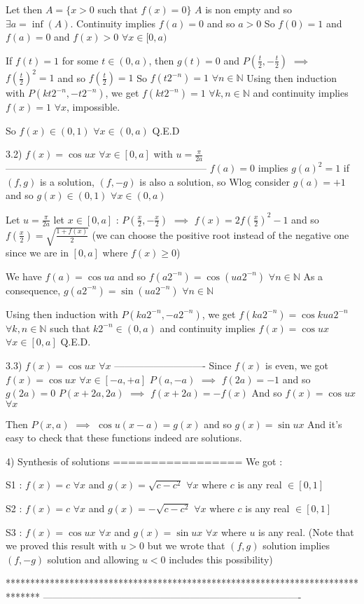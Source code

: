 \begin{solution}
Let then $A=\{x>0$ such that $f(x)=0\}$
$A$ is non empty and so $\exists a=\inf(A)$. Continuity implies $f(a)=0$ and so $a>0$
So $f(0)=1$ and $f(a)=0$ and $f(x)>0$ $\forall x\in[0,a)$

If $f(t)=1$ for some $t\in(0,a)$, then $g(t)=0$ and $P(\frac t2,-\frac t2)$ $\implies$ $f(\frac t2)^2=1$ and so $f(\frac t2)=1$
So $f(t2^{-n})=1$ $\forall n\in\mathbb N$
Using then induction with $P(kt2^{-n},-t2^{-n})$, we get $f(kt2^{-n})=1$ $\forall k,n\in\mathbb N$ and continuity implies $f(x)=1$ $\forall x$, impossible.

So $f(x)\in(0,1)$ $\forall x\in(0,a)$
Q.E.D

3.2) $f(x)=\cos ux$ $\forall x\in [0,a]$ with $u=\frac{\pi}{2a}$
--------------------------------------------------------------
$f(a)=0$ implies $g(a)^2=1$
if $(f,g)$ is a solution, $(f,-g)$ is also a solution, so Wlog consider $g(a)=+1$ and so $g(x)\in(0,1)$ $\forall x\in(0,a)$

Let $u=\frac{\pi}{2a}$
let $x\in [0,a]$ : $P(\frac x2,-\frac x2)$ $\implies$ $f(x)=2f(\frac x2)^2-1$ and so $f(\frac x2)=\sqrt{\frac{1+f(x)}2}$
(we can choose the positive root instead of the negative one since we are in $[0,a]$ where $f(x)\ge 0$)

We have $f(a)=\cos ua$ and so $f(a2^{-n})=\cos (ua2^{-n})$ $\forall n\in\mathbb N$
As a consequence, $g(a2^{-n})=\sin (ua2^{-n})$ $\forall n\in\mathbb N$

Using then induction with $P(ka2^{-n},-a2^{-n})$, we get $f(ka2^{-n})=\cos kua2^{-n} $ $\forall k,n\in\mathbb N$ such that $k2^{-n}\in(0,a)$ and continuity implies $f(x)=\cos ux$ $\forall x\in [0,a]$
Q.E.D.

3.3) $f(x)=\cos ux$ $\forall x$
----------------------------
Since $f(x)$ is even, we got $f(x)=\cos ux$ $\forall x\in[-a,+a]$
$P(a,-a)$ $\implies$ $f(2a)=-1$ and so $g(2a)=0$
$P(x+2a,2a)$ $\implies$ $f(x+2a)=-f(x)$
And so $f(x)=\cos ux$ $\forall x$

Then $P(x,a)$ $\implies$ $\cos u(x-a)=g(x)$ and so $g(x)=\sin ux$
And it's easy to check that these functions indeed are solutions.

4) Synthesis of solutions
=================
We got :

S1 : $f(x)=c$ $\forall x$ and $g(x)=\sqrt{c-c^2}$ $\forall x$ where $c$ is any real $\in[0,1]$

S2 : $f(x)=c$ $\forall x$ and $g(x)=-\sqrt{c-c^2}$ $\forall x$ where $c$ is any real $\in[0,1]$

S3 : $f(x)=\cos ux$ $\forall x$ and $g(x)=\sin ux$ $\forall x$ where $u$ is any real.
(Note that we proved this result with $u>0$ but we wrote that $(f,g)$ solution implies $(f,-g)$ solution and allowing $u<0$ includes this possibility)
\end{solution}
*******************************************************************************
-------------------------------------------------------------------------------

